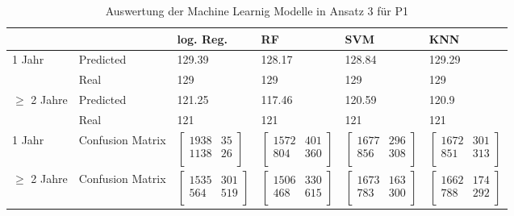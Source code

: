 \begin{table}[ht]
  \caption{\label{tab:ergebnisA3P1} Auswertung der Machine Learnig Modelle in Ansatz 3 f\"ur P1}
  \begin{tabular}{ p{2cm} p{2cm} p{2cm} p{2cm} p{2cm} p{2cm} }
    \toprule
     & & log. Reg. & RF & SVM & KNN \\
    \midrule
    \multirow{2}{3em}{1 Jahr}
    & Predicted & 129.39 &128.17 &128.84 & 129.29 \\
    & Real  & 129 & 129 & 129 & 129 \\

    \multirow{2}{2.5cm}{$\geq$ 2 Jahre}
    & Predicted & 121.25 &117.46 &120.59 &120.9 \\
    & Real  & 121 & 121 & 121 & 121 \\
    \midrule

    1 Jahr & Confusion Matrix & $\left[ \begin{array}{rr} 1938 & 35  \\  1138 & 26 \\  \end{array}\right]$ & $\left[ \begin{array}{rr} 1572 & 401  \\  804 & 360 \\  \end{array}\right]$ & $\left[ \begin{array}{rr} 1677 & 296  \\  856 & 308 \\  \end{array}\right]$ & $\left[ \begin{array}{rr} 1672 & 301  \\  851 & 313 \\  \end{array}\right]$ \\
  
    $\geq$ 2 Jahre & Confusion Matrix & $\left[ \begin{array}{rr} 1535 & 301 \\  564 & 519 \\  \end{array}\right]$ & $\left[ \begin{array}{rr} 1506 & 330  \\  468 & 615 \\  \end{array}\right]$ & $\left[ \begin{array}{rr} 1673 & 163  \\  783 & 300 \\  \end{array}\right]$ & $\left[ \begin{array}{rr} 1662 & 174  \\  788 & 292 \\  \end{array}\right]$ \\
  

\end{tabular}
\end{table}
